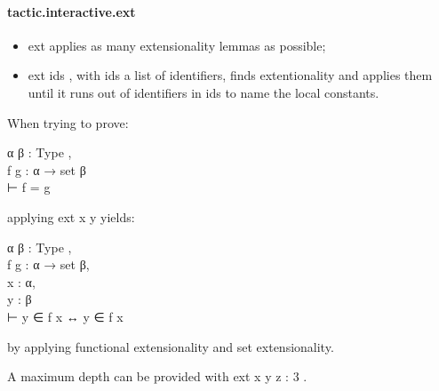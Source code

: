 \documentclass{article}
\begin{document}
\paragraph{tactic.interactive.ext}
\begin{itemize}\item \colorbox[RGB]{253,246,227}{{{{\color[RGB]{101, 123, 131} ext }}}} applies as many extensionality lemmas as possible;

\item \colorbox[RGB]{253,246,227}{{{{\color[RGB]{101, 123, 131} ext ids }}}}, with 
\colorbox[RGB]{253,246,227}{{{{\color[RGB]{101, 123, 131} ids }}}} a list of identifiers, finds extentionality and applies them
until it runs out of identifiers in 
\colorbox[RGB]{253,246,227}{{{{\color[RGB]{101, 123, 131} ids }}}} to name the local constants.

\end{itemize}\par
When trying to prove:
\\
\colorbox[RGB]{253,246,227}{\parbox{4.5in}{{{{\color[RGB]{101, 123, 131} α β :  }}}{{{\color[RGB]{38, 139, 210} Type }}}{{{\color[RGB]{101, 123, 131} ,
 }}}\\
{{{\color[RGB]{101, 123, 131} f g : α  }}}{{{\color[RGB]{133, 153, 0} → }}}{{{\color[RGB]{101, 123, 131}  set β
 }}}\\
{{{\color[RGB]{101, 123, 131} ⊢ f  }}}{{{\color[RGB]{181, 137, 0} = }}}{{{\color[RGB]{101, 123, 131}  g
 }}}\\

}}\par
applying 
\colorbox[RGB]{253,246,227}{{{{\color[RGB]{101, 123, 131} ext x y }}}} yields:
\\
\colorbox[RGB]{253,246,227}{\parbox{4.5in}{{{{\color[RGB]{101, 123, 131} α β :  }}}{{{\color[RGB]{38, 139, 210} Type }}}{{{\color[RGB]{101, 123, 131} ,
 }}}\\
{{{\color[RGB]{101, 123, 131} f g : α  }}}{{{\color[RGB]{133, 153, 0} → }}}{{{\color[RGB]{101, 123, 131}  set β,
 }}}\\
{{{\color[RGB]{101, 123, 131} x : α,
 }}}\\
{{{\color[RGB]{101, 123, 131} y : β
 }}}\\
{{{\color[RGB]{101, 123, 131} ⊢ y ∈ f x  }}}{{{\color[RGB]{181, 137, 0} ↔ }}}{{{\color[RGB]{101, 123, 131}  y ∈ f x
 }}}\\

}}\par
by applying functional extensionality and set extensionality.
\par
A maximum depth can be provided with 
\colorbox[RGB]{253,246,227}{{{{\color[RGB]{101, 123, 131} ext x y z :  }}}{{{\color[RGB]{108, 113, 196} 3 }}}}.
\end{document}
